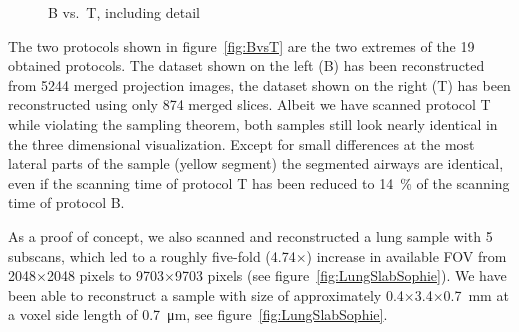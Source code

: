 \begin{figure}
{			}%
	\caption{B vs.\ T, including detail}
	\label{fig:BvsT2}
\end{figure}
\cbend

The two protocols shown in figure~\ref{fig:BvsT} are the two extremes of the 19 obtained protocols. The dataset shown on the left (B) has been reconstructed from 5244 merged projection images, the dataset shown on the right (T) has been reconstructed using only 874 merged slices. Albeit we have scanned protocol T while violating the sampling theorem, both samples still look nearly identical in the three dimensional visualization. Except for small differences at the most lateral parts of the sample (yellow segment) the segmented airways are identical, even if the scanning time of protocol T has been reduced to \SI{14}{\percent} of the scanning time of protocol B.

As a proof of concept, we also scanned and reconstructed a lung sample with 5 subscans, which led to a roughly five-fold (4.74\(\times\)) increase in available FOV from 2048\(\times\)2048 pixels to 9703\(\times\)9703 pixels (see figure~\ref{fig:LungSlabSophie}). We have been able to reconstruct a sample with size of approximately 0.4\(\times\)3.4\(\times\)\SI{0.7}{\milli\meter} at a voxel side length of \SI{0.7}{\micro\meter}, see figure~\ref{fig:LungSlabSophie}.

